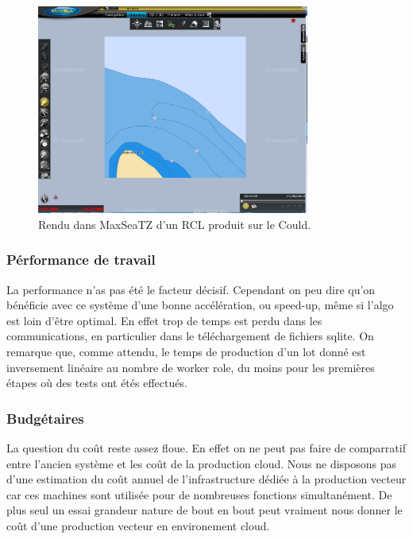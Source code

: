 \begin{figure}[h!]
  \caption{Rendu dans MaxSeaTZ d'un RCL produit sur le Could.}
  \centering
    \includegraphics[width=0.8\textwidth]{images/rcl_L10_R799_C146.png}
\end{figure}

%
%



\subsubsection{Pérformance de travail}
La performance n'as pas été le facteur décisif.  Cependant on peu dire
qu'on bénéficie avec ce système d'une bonne accélération, ou speed-up,
même si l'algo est loin d'être optimal. En effet trop de temps est
perdu dans les communications, en particulier dans le téléchargement
de fichiers sqlite. On remarque que, comme attendu, le temps de
production d'un lot donné est inversement linéaire au nombre de worker
role, du moins pour les premières étapes où des tests ont étés
effectués.

\subsubsection{Budgétaires}
La question du coût reste assez floue. En effet on ne peut pas faire
de comparratif entre l'ancien système et les coût de la production
cloud. Nous ne disposons pas d'une estimation du coût annuel de
l'infrastructure dédiée à la production vecteur car ces machines sont
utilisée pour de nombreuses fonctions simultanément. De plus seul un
essai grandeur nature de bout en bout peut vraiment nous donner le
coût d'une production vecteur en environement cloud.


